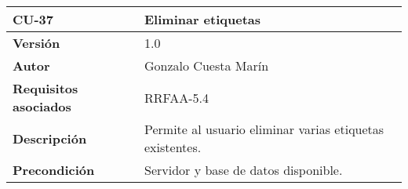 \begin{longtable}[]{@{}ll@{}}
\toprule
\begin{minipage}[b]{0.21\columnwidth}\raggedright
\textbf{CU-37}\strut
\end{minipage} & \begin{minipage}[b]{0.74\columnwidth}\raggedright
\textbf{Eliminar etiquetas}\strut
\end{minipage}\tabularnewline
\midrule
\endhead
\begin{minipage}[t]{0.21\columnwidth}\raggedright
\textbf{Versión}\strut
\end{minipage} & \begin{minipage}[t]{0.74\columnwidth}\raggedright
1.0\strut
\end{minipage}\tabularnewline
\begin{minipage}[t]{0.21\columnwidth}\raggedright
\textbf{Autor}\strut
\end{minipage} & \begin{minipage}[t]{0.74\columnwidth}\raggedright
Gonzalo Cuesta Marín\strut
\end{minipage}\tabularnewline
\begin{minipage}[t]{0.21\columnwidth}\raggedright
\textbf{Requisitos asociados}\strut
\end{minipage} & \begin{minipage}[t]{0.74\columnwidth}\raggedright
RRFAA-5.4\strut
\end{minipage}\tabularnewline
\begin{minipage}[t]{0.21\columnwidth}\raggedright
\textbf{Descripción}\strut
\end{minipage} & \begin{minipage}[t]{0.74\columnwidth}\raggedright
Permite al usuario eliminar varias etiquetas existentes.\strut
\end{minipage}\tabularnewline
\begin{minipage}[t]{0.21\columnwidth}\raggedright
\textbf{Precondición}\strut
\end{minipage} & \begin{minipage}[t]{0.74\columnwidth}\raggedright
Servidor y base de datos disponible.


\end{minipage}
\end{longtable}
